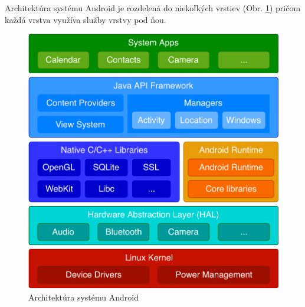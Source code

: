 \documentclass{template/socthesis}
\begin{document}
Architektúra systému Android je rozdelená do niekoľkých vrstiev (Obr. \ref{fig:android_architecture}) pričom každá vrstva využíva služby vrstvy pod ňou. 
\begin{center}
	\begin{figure}[H]
		\centering
		\includegraphics[scale=0.80]{android_architecture}
		\caption{Architektúra systému Android}
		\label{fig:android_architecture}
	\end{figure}
\end{center}
\end{document}
